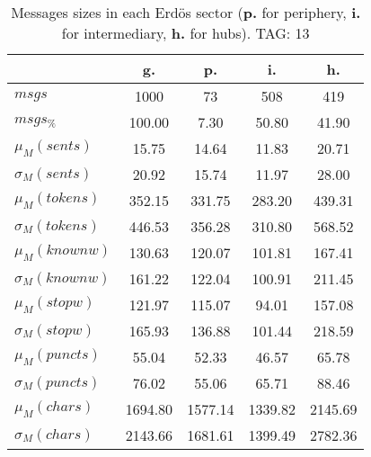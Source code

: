 \begin{table}[h!]
\begin{center}
\begin{tabular}{| l || c | c | c | c |}\hline
 & {\bf g.} & {\bf p.} & {\bf i.} & {\bf h.} \\\hline\hline
$msgs$ & 1000  & 73  & 508  & 419 \\
$msgs_{\%}$ & 100.00  & 7.30  & 50.80  & 41.90 \\\hline
$\mu_M(sents)$ & 15.75  & 14.64  & 11.83  & 20.71 \\
$\sigma_M(sents)$ & 20.92  & 15.74  & 11.97  & 28.00 \\\hline
$\mu_M(tokens)$ & 352.15  & 331.75  & 283.20  & 439.31 \\
$\sigma_M(tokens)$ & 446.53  & 356.28  & 310.80  & 568.52 \\\hline
$\mu_M(knownw)$ & 130.63  & 120.07  & 101.81  & 167.41 \\
$\sigma_M(knownw)$ & 161.22  & 122.04  & 100.91  & 211.45 \\\hline
$\mu_M(stopw)$ & 121.97  & 115.07  & 94.01  & 157.08 \\
$\sigma_M(stopw)$ & 165.93  & 136.88  & 101.44  & 218.59 \\\hline
$\mu_M(puncts)$ & 55.04  & 52.33  & 46.57  & 65.78 \\
$\sigma_M(puncts)$ & 76.02  & 55.06  & 65.71  & 88.46 \\\hline
$\mu_M(chars)$ & 1694.80  & 1577.14  & 1339.82  & 2145.69 \\
$\sigma_M(chars)$ & 2143.66  & 1681.61  & 1399.49  & 2782.36 \\\hline
\end{tabular}
\caption{Messages sizes in each Erd\"os sector ({{\bf p.}} for periphery, {{\bf i.}} for intermediary, {{\bf h.}} for hubs). TAG: 13}
\end{center}
\end{table}